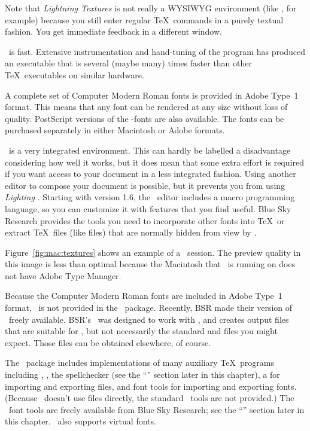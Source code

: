         Note that {\it Lightning Textures\/} is not really a WYSIWYG
        environment (like , for example) because
        you still enter regular \TeX\ commands in a purely textual
        fashion.  You get immediate feedback in a different window.

\Textures\ is fast.  Extensive instrumentation and hand-tuning
        of the program has produced an executable that is
        several (maybe many) times faster than other \TeX\ executables
        on similar hardware.

A complete set of Computer Modern Roman fonts is provided 
        in Adobe Type~1 format.  This means that any font can
        be rendered at any size without loss of quality.
PostScript versions of the \AmS-fonts are also available.  The
        fonts can be purchased separately in either Macintosh or
        Adobe  formats.

\Textures\ is a very integrated environment.  This can hardly be
labelled a disadvantage considering how well it works, but it does
mean that some extra effort is required if you want access to your
document in a less integrated fashion.  Using another editor to
compose your document is possible, but it prevents you from using
{\it Lighting} \Textures.  Starting with version 1.6, the
\Textures\ editor includes a macro programming language, so you can
customize it with features that you find useful.  Blue Sky Research
provides the tools you need to incorporate other fonts into
\TeX\ or extract \TeX\ files (like  files) that are normally
hidden from view by \Textures.

Figure~\ref{fig:mac:textures} shows an example of a \Textures\ session.  The
preview quality in this image is less than optimal because the Macintosh
that \Textures\ is running on does not have Adobe Type Manager.


Because the Computer Modern Roman fonts are included in Adobe Type~1
format, \MF\ is not provided in the \Textures\ package.  Recently, BSR
made their version of \MF\ freely available.
BSR's \MF\ 
was designed to work with \Textures, and creates output files that are
suitable for \Textures, but not necessarily the standard \ext{GF} and
\ext{TFM} files you might expect.  Those files can be obtained elsewhere, of course.

The \Textures\ package includes implementations of many auxiliary \TeX\
programs including , , 
the \program{\idx{Excalibur}}
spellchecker (see the ``\nameref{sec:Excalibur}'' section later in
this chapter), a 
for importing and exporting \ext{DVI} files, and font tools for importing
and exporting fonts. (Because \Textures\ doesn't use  files directly,
the standard \mfware\ tools are not provided.)  The \Textures\ font tools
are freely available from Blue Sky Research; see the ``\nameref{sec:bsrtools}''
section later in this chapter.  \Textures\ also supports virtual fonts.

